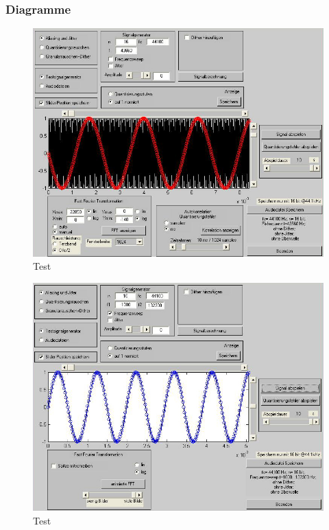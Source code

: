\subsubsection{Diagramme}
\begin{figure}[h!]
\centering
\includegraphics[width=\columnwidth]{figures/Aufg1/1_1.JPG} 
\caption{Test}
\end{figure}

\begin{figure}[h!]
\centering
\includegraphics[width=\columnwidth]{figures/Aufg1/1_2.JPG} 
\caption{Test}
\end{figure}

